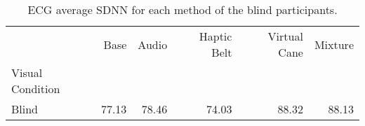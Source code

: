 
\begin{table}[!htb]
\centering
\caption{ECG average SDNN for each method of the blind participants.}
\label{tab:sdnn_average_group_blind [ms]}
\begin{tabular}{lrrrrr}
\toprule
{} &   Base &  Audio & Haptic Belt & Virtual Cane & Mixture \\
Visual Condition &        &        &             &              &         \\
\midrule
Blind            &  77.13 &  78.46 &       74.03 &        88.32 &   88.13 \\
\bottomrule
\end{tabular}
\end{table}

